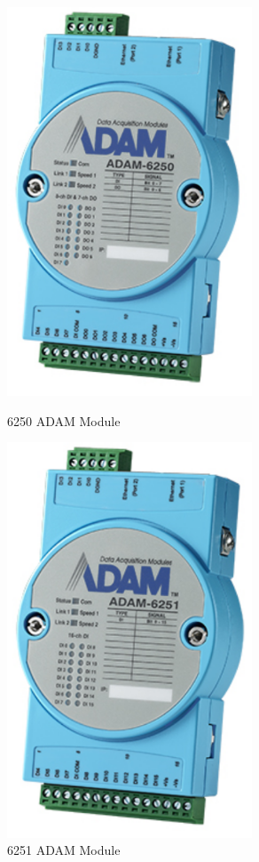         \begin{figure}[H]
        \centering
        \begin{minipage}{0.4\textwidth}
            \centering
            \includegraphics[width = 0.65\textwidth]{2_images/adam6250.png}
            \caption{6250 ADAM Module~\cite{6250Data}}
            \label{fig:adam6250}
        \end{minipage}\hfill
        \begin{minipage}{0.4\textwidth}
            \centering
            \includegraphics[width = 0.65\textwidth]{2_images/adam6251.png}
            \caption{6251 ADAM Module~\cite{6251Data}}
            \label{fig:adam6251}
        \end{minipage}\hfill            
        \end{figure}   
    
